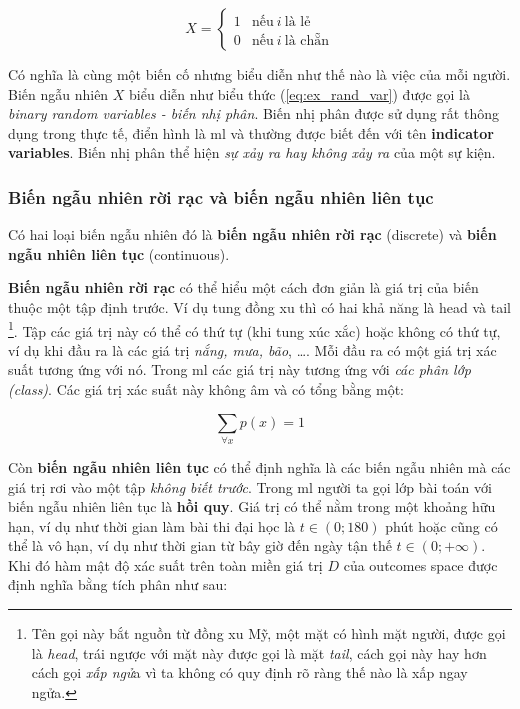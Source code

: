 \documentclass[../main-report.tex]{subfiles}
\begin{document}
\begin{equation} \label{eq:ex_rand_var}
X = \left\{\begin{array}{ll}
	1 & \text{nếu}~ i~ \text{là lẻ} \\
	0 & \text{nếu}~ i~ \text{là chẵn}
	\end{array}\right.
\end{equation}

Có nghĩa là cùng một biến cố nhưng biểu diễn như thế nào là việc của mỗi người. Biến ngẫu nhiên $X$ biểu diễn như biểu thức (\ref{eq:ex_rand_var}) được gọi là \textit{binary random variables - biến nhị phân}. Biến nhị phân được sử dụng rất thông dụng trong thực tế, điển hình là \gls{ml} và thường được biết đến với tên \textbf{indicator variables}. Biến nhị phân thể hiện \textit{sự xảy ra hay không xảy ra} của một sự kiện.

\subsubsection*{Biến ngẫu nhiên rời rạc và biến ngẫu nhiên liên tục}
Có hai loại biến ngẫu nhiên đó là \textbf{biến ngẫu nhiên rời rạc} (discrete) và \textbf{biến ngẫu nhiên liên tục} (continuous).

\textbf{Biến ngẫu nhiên rời rạc} có thể hiểu một cách đơn giản là giá trị của biến thuộc một tập định trước. 
Ví dụ tung đồng xu thì có hai khả năng là head và tail \footnote{Tên gọi này bắt nguồn từ đồng xu Mỹ, một mặt có hình mặt người, được gọi là \textit{head}, trái ngược với mặt này được gọi là mặt \textit{tail}, cách gọi này hay hơn cách gọi \textit{xấp ngử}a vì ta không có quy định rõ ràng thế nào là xấp ngay ngửa.}. Tập các giá trị này có thể có thứ tự (khi tung xúc xắc) hoặc không có thứ tự, ví dụ khi đầu ra là các giá trị \textit{nắng, mưa, bão}, \ldots. Mỗi đầu ra có một giá trị xác suất tương ứng với nó. Trong \gls{ml} các giá trị này tương ứng với \textit{các phân lớp (class)}. Các giá trị xác suất này không âm và có tổng bằng một:

\begin{equation}
\sum_{\forall x}{p(x)}=1 
\end{equation}

Còn \textbf{biến ngẫu nhiên liên tục} có thể định nghĩa là các biến ngẫu nhiên mà các giá trị rơi vào một tập \textit{không biết trước}. Trong \gls{ml} người ta gọi lớp bài toán với biến ngẫu nhiên liên tục là \textbf{hồi quy}. Giá trị có thể nằm trong một khoảng hữu hạn, ví dụ như thời gian làm bài thi đại học là $t \in \left ( 0;180 \right )$ phút hoặc cũng có thể là vô hạn, ví dụ như thời gian từ bây giờ đến ngày tận thế $t \in \left ( 0; +\infty \right )$. Khi đó hàm mật độ xác suất trên toàn miền giá trị $D$ của outcomes space được định nghĩa bằng tích phân như sau:
\end{document}
